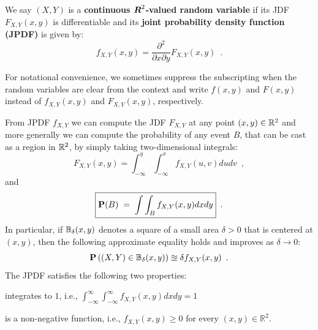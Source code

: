 \begin{definition}[JPDF] We say $(X,Y)$ is a {\bf continuous $\R^2$-valued random variable} if its JDF $F_{X,Y}(x,y)$ is differentiable and its {\bf joint probability density function (JPDF)} is given by:
\[
f_{X,Y}(x,y) = \frac{\partial^2}{\partial x \partial y} F_{X,Y}(x,y) \enspace .
\]
\end{definition}

For notational convenience, we sometimes suppress the subscripting when the random variables are clear from the context and write $f(x,y)$ and $F(x,y)$ instead of $f_{X,Y}(x,y)$ and $F_{X,Y}(x,y)$, respectively.

From JPDF $f_{X,Y}$ we can compute the JDF $F_{X,Y}$ at any point $(x,y) \in \mathbb{R}^2$ and more generally we can compute the probability of any event $B$, that can be cast as a region in $\mathbb{R}^2$, by simply taking two-dimensional integrals:
\begin{equation}\label{Eq:2ContjDFFromjPDF}
\boxed{F_{X,Y}(x,y) = \int_{-\infty}^{y} \int_{-\infty}^{x} f_{X,Y}(u,v) du dv}\enspace ,
\end{equation}
and
\begin{equation}\label{Eq:2ContProbEventFromjPDF}
\boxed{\mathbf{P}(B)\;=\; \int\int_{B} f_{X,Y}(x,y) dx dy}\enspace .
\end{equation}
In particular, if $\mathbb{B}_{\delta}(x,y)$ denotes a square of a small area $\delta>0$ that is centered at $(x,y)$, then the following approximate equality holds and improves as $\delta \to 0$:
\begin{equation}\label{Eq:2ContProbEventFromjPDFInSmallBall}
\mathbf{P}\left( (X,Y) \in \mathbb{B}_{\delta}(x,y) \right) \approxeq \delta f_{X,Y}(x,y) \enspace .
\end{equation}
The JPDF satisfies the following two properties:
\be
\item integrates to $1$, i.e., $\int_{-\infty}^{\infty} \int_{-\infty}^{\infty} f_{X,Y}(x,y) dx dy=1$
\item is a non-negative function, i.e., $f_{X,Y}(x,y) \geq 0$ for every $(x,y) \in \mathbb{R}^2$.
\ee

